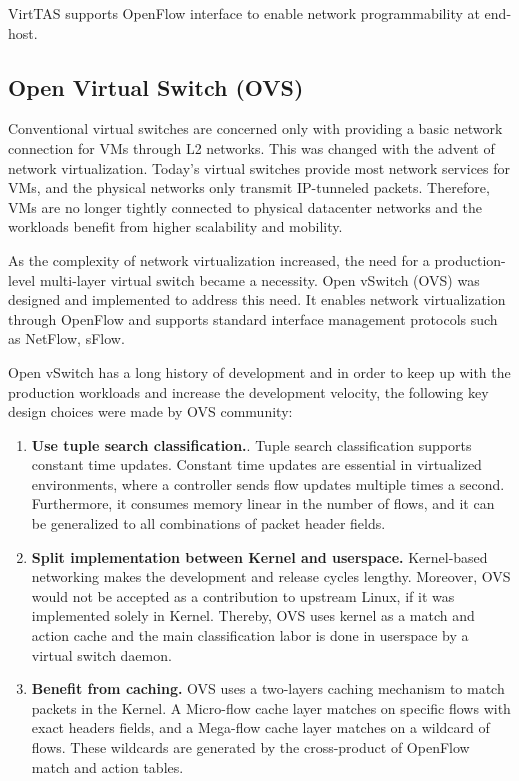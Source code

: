 VirtTAS supports OpenFlow interface to enable network programmability at end-host.

\subsection{Open Virtual Switch (OVS)}
\label{OVS}

Conventional virtual switches are concerned only with providing a basic network connection 
for VMs through L2 networks. This was changed with the advent of network virtualization. 
Today's virtual switches provide most network services for VMs, and the physical networks 
only transmit IP-tunneled packets. Therefore, VMs are no longer tightly connected to physical 
datacenter networks and the workloads benefit from higher scalability and mobility.

As the complexity of network virtualization increased, the need for a production-level 
multi-layer virtual switch became a necessity. Open vSwitch (OVS) was designed and implemented 
to address this need. It enables network virtualization through OpenFlow and supports standard 
interface management protocols such as NetFlow\cite{claise2004cisco}, sFlow\cite{wang2004sflow}.

Open vSwitch has a long history of development and in order to keep up with the production 
workloads and increase the development velocity, the following key design choices were made 
by OVS community:

\begin{enumerate}
    \item \textbf{Use tuple search classification.}.  Tuple search classification supports 
    constant time updates. Constant time updates are essential in virtualized environments,
    where a controller sends flow updates multiple times a second. Furthermore, it consumes 
    memory linear in the number of flows, and it can be generalized to all combinations of 
    packet header fields.

    \item \textbf{Split implementation between Kernel and userspace.} Kernel-based networking 
    makes the development and release cycles lengthy. Moreover, OVS would not be accepted as 
    a contribution to upstream Linux, if it was implemented solely in Kernel. Thereby, OVS 
    uses kernel as a match and action cache and the main classification labor is done in 
    userspace by a virtual switch daemon.

    \item \textbf{Benefit from caching.} OVS uses a two-layers caching mechanism to match 
    packets in the Kernel. A Micro-flow cache layer matches on specific flows with exact 
    headers fields, and a Mega-flow cache layer matches on a wildcard of flows. These wildcards 
    are generated by the cross-product of OpenFlow match and action tables.
    
\end{enumerate}

